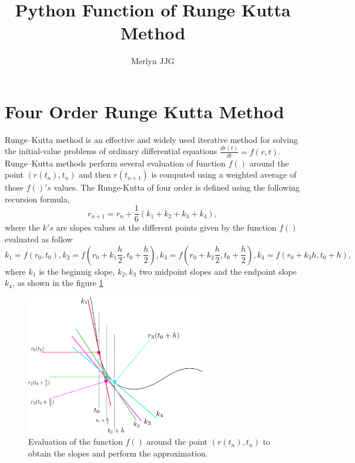 \documentclass[12pt]{article}
\title{Python Function of Runge Kutta Method}
\author{Merlyn JJG}
\begin{document}
\maketitle

\section{Four Order Runge Kutta Method }
\label{sec:rk4}

Runge–Kutta method is an effective and widely used iterative method
for solving the initial-value problems of ordinary differential
equations \(\frac{dr(t)}{dt}=f(r,t)\). Runge–Kutta methods perform
several evaluation of function \(f()\) around the point
\((r(t_{n}),t_{n})\) and then \(r(t_{n+1})\) is computed using a
weighted average of those \(f()'s\) values. The Runge-Kutta of four
order is defined using the following recursion formula,
\begin{equation}
  \label{eq:RecursionFormulaeSolution}
  r_{n+1} = r_{n} + \frac{1}{6}(k_{1}+k_{2}+k_{3}+k_{4}),
\end{equation}
where the \(k's\) are slopes values at the different points
given by the function \(f()\) evaluated as follow
\begin{subequations}
  \begin{equation}
    \label{eq:slope1}
    k_{1}= f(r_{0},t_{0}),
  \end{equation}
  \begin{equation}
    \label{eq:slope2}
    k_{2}= f(r_{0}+k_{1}\frac{h}{2},t_{0}+\frac{h}{2}),
  \end{equation}
  \begin{equation}
    \label{eq:slope3}
    k_{3}= f(r_{0}+k_{2}\frac{h}{2},t_{0}+\frac{h}{2}),
  \end{equation}
    \begin{equation}
    \label{eq:slope4}
    k_{4}= f(r_{0}+k_{3}h, t_{0}+h),
  \end{equation}
\end{subequations}
where \(k_{1}\) is the beginnig slope, \(k_{2},k_{3}\) two midpoint
slopes and the endpoint slope \(k_{4}\), as shown in the figure
\ref{fig:CurveSlopes}
\begin{figure}
  \centering
  \includegraphics[width=0.7\textwidth]{CurveSlopes.png}
  \caption[Slopes]{Evaluation of the function $f()$ around the point $(r(t_{n}),t_{n})$
to obtain the slopes and perform the approximation.}
\label{fig:CurveSlopes}
\end{figure}
\end{document}

